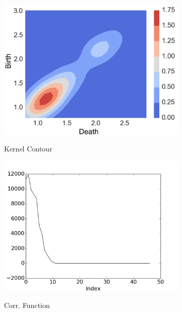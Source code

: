 \documentclass[12pt]{article}
\begin{document}
\begin{figure}[htbp]
\begin{subfigure}{.24\textwidth}
    \label{fig:examplestest4}
  \end{subfigure}
    \begin{subfigure}{.24\textwidth}
    \centering
        \caption{Kernel Contour}  \includegraphics[width=\linewidth]{test_pics_5.pdf}
    \label{fig:examplestest5}
  \end{subfigure}
    \begin{subfigure}{.24\textwidth}
    \centering
        \caption{Corr. Function}  \includegraphics[width=\linewidth]{test_pics_6.pdf}
    \label{fig:examplestest6}
  \end{subfigure}
    \begin{subfigure}{.24\textwidth}
    \centering

\end{subfigure}
\end{figure}
\end{document}

